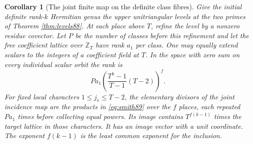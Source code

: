 \documentclass[a4paper,11pt]{article}
\newtheorem{corollary}[proposition]{Corollary}
\theoremstyle{definition}
\theoremstyle{remark}
\newcommand{\ZZ}{\mathbb Z}\newcommand{\ord}{\operatorname{ord}}
\numberwithin{equation}{section}
\begin{document}
\begin{corollary}[The joint finite map on the definite class fibres]
\label{cor:fibres89}
Give the initial definite rank-\(k\) Hermitian genus the
upper unitriangular levels at the two primes of Theorem \ref{thm:levels88}. At each place above \(T\), refine the level by a
nonzero residue covector. Let \(P\) be the number of classes
before this refinement and let the free coefficient lattice
over \(\ZZ_T\) have rank \(a_1\) per class. One may equally
extend scalars to the integers of a coefficient field at \(T\).
In the space with zero sum on every individual scalar orbit the
rank is
\begin{equation}
      Pa_1\left(\frac{T^k-1}{T-1}(T-2)\right)^f .
                                                        \label{eq:rank89}
\end{equation}
For fixed local characters \(1\le j_v\le T-2\), the elementary
divisors of the joint incidence map are the products in
\eqref{eq:smith89} over the \(f\) places, each repeated \(Pa_1\)
times before collecting equal powers. Its image contains
\(T^{f(k-1)}\) times the target lattice in those characters.
It has an image vector with a unit coordinate. The exponent
\(f(k-1)\) is the least common exponent for the inclusion.
\end{corollary}
\end{document}
